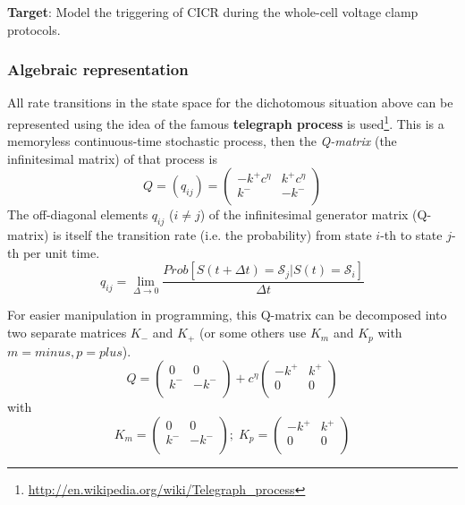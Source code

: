 {\bf Target}: Model the triggering of CICR during the whole-cell
voltage clamp protocols.

\subsubsection{Algebraic representation}
\label{sec:algebr-repr}

All rate transitions in the state space for the dichotomous situation
above can be represented using the idea of the famous
{\bf telegraph process} is
used\footnote{\url{http://en.wikipedia.org/wiki/Telegraph_process}}.
This is a memoryless continuous-time stochastic process,
then the {\it Q-matrix} (the infinitesimal matrix) of that process is
\begin{equation}
\label{eq:179}
  Q = (q_{ij}) = \left( 
    \begin{array}{cc}
      -k^+c^\eta & k^+c^\eta\\
      k^- & -k^-\\
    \end{array}
\right)
\end{equation}
The off-diagonal elements $q_{ij}$ ($i\ne j$) of the infinitesimal
generator matrix (Q-matrix) is itself the transition rate (i.e. the
probability) from state $i$-th to state $j$-th per unit time.
\begin{equation}
  \label{eq:181}
  q_{ij} = \lim_{\Delta \rightarrow 0} \frac{Prob[S(t+\Delta t) = \mathcal{S}_j| S(t)
    =\mathcal{S}_i ]}{\Delta t}
\end{equation}

For easier manipulation in programming, this Q-matrix can be
decomposed into two separate matrices $K_-$ and $K_+$ (or some others
use $K_m$ and $K_p$ with $m=minus, p=plus$).
\begin{equation}
  \label{eq:180}
  Q =  \left( 
    \begin{array}{cc}
      0 & 0\\
      k^- & -k^-\\
    \end{array}
\right) + c^\eta  \left( 
    \begin{array}{cc}
     -k^+ & k^+\\
     0 & 0\\
    \end{array}
\right)
\end{equation}
with
\begin{equation}
  \label{eq:388}
K_m =  \left( 
    \begin{array}{cc}
      0 & 0\\
      k^- & -k^-\\
    \end{array}
\right); \; K_p =  \left( 
    \begin{array}{cc}
     -k^+ & k^+\\
     0 & 0\\
    \end{array}
\right)  
\end{equation}

